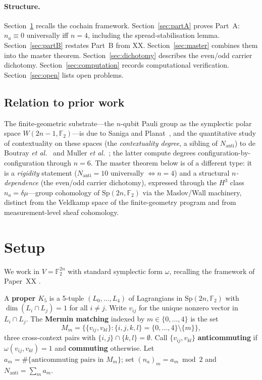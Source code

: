 \documentclass[11pt,a4paper]{article}
\newcommand{\Nanti}{N_{\mathrm{anti}}}
\newcommand{\Sp}{\mathrm{Sp}}
\newcommand{\F}{\mathbb{F}}
\theoremstyle{plain}
\theoremstyle{definition}
\theoremstyle{remark}
\begin{document}
\paragraph{Structure.}
Section~\ref{sec:setup} recalls the cochain framework.
Section~\ref{sec:partA} proves Part~A: $n_a \equiv 0$ universally iff $n=4$,
including the spread-stabilisation lemma.
Section~\ref{sec:partB} restates Part~B from XX.
Section~\ref{sec:master} combines them into the master theorem.
Section~\ref{sec:dichotomy} describes the even/odd carrier dichotomy.
Section~\ref{sec:computation} records computational verification.
Section~\ref{sec:open} lists open problems.

\subsection*{Relation to prior work}

The finite-geometric substrate---the $n$-qubit Pauli group as the symplectic polar
space $W(2n-1,\mathbb{F}_2)$---is due to Saniga and Planat~\cite{SanigaPlanat}, and
the quantitative study of contextuality on these spaces (the \emph{contextuality
degree}, a sibling of $N_{\mathrm{anti}}$) to de Boutray \emph{et al.}~\cite{deBoutray}
and Muller \emph{et al.}~\cite{Muller}; the latter compute degrees configuration-by-
configuration through $n=6$. The master theorem below is of a different type: it is a
\emph{rigidity} statement ($N_{\mathrm{anti}}=10$ universally $\iff n=4$) and a
structural \emph{$n$-dependence} (the even/odd carrier dichotomy), expressed through
the $H^3$ class $n_a=\delta\mu$---group cohomology of $\mathrm{Sp}(2n,\mathbb{F}_2)$
via the Maslov/Wall machinery, distinct from the Veldkamp space of the finite-geometry
program and from measurement-level sheaf cohomology.

\section{Setup}
\label{sec:setup}

We work in $V = \F_2^{2n}$ with standard symplectic form $\omega$,
recalling the framework of Paper~XX \cite{PaperXX}.

A \textbf{proper $K_5$} is a 5-tuple $(L_0,\ldots,L_4)$ of Lagrangians
in $\Sp(2n,\F_2)$ with $\dim(L_i \cap L_j) = 1$ for all $i \neq j$.
Write $v_{ij}$ for the unique nonzero vector in $L_i \cap L_j$.
The \textbf{Mermin matching} indexed by $m \in \{0,\ldots,4\}$ is the set
\[
  M_m = \bigl\{\{v_{ij}, v_{kl}\}
  : \{i,j,k,l\} = \{0,\ldots,4\} \setminus \{m\}\bigr\},
\]
three cross-context pairs with $\{i,j\} \cap \{k,l\} = \emptyset$.
Call $\{v_{ij},v_{kl}\}$ \textbf{anticommuting} if $\omega(v_{ij},v_{kl})=1$
and \textbf{commuting} otherwise.
Let $a_m = \#\{\text{anticommuting pairs in }M_m\}$;
set $(n_a)_m = a_m \bmod 2$ and $\Nanti = \sum_m a_m$.
\end{document}
